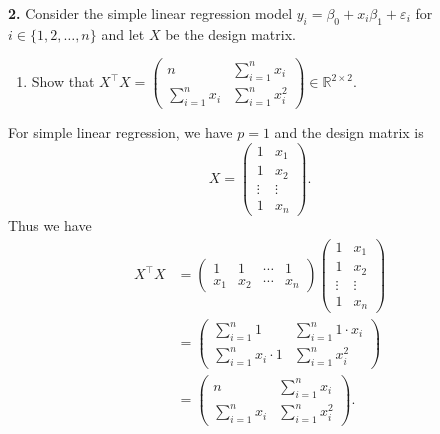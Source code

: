 \documentclass[
  a4paper,
]{article}
\providecommand{\tightlist}{%
  \setlength{\itemsep}{0pt}\setlength{\parskip}{0pt}}
\theoremstyle{definition}
\theoremstyle{definition}
\theoremstyle{definition}
\theoremstyle{definition}
\theoremstyle{remark}
\begin{document}
\textbf{2.} Consider the simple linear regression model
\(y_i = \beta_0 + x_{i} \beta_1 + \varepsilon_i\) for
\(i \in \{1, 2, \ldots, n\}\) and let \(X\) be the design matrix.

\begin{enumerate}
\def\labelenumi{\alph{enumi}.}
\tightlist
\item
  Show that \(\displaystyle X^\top X = \begin{pmatrix}
   n & \sum_{i=1}^n x_i \\
   \sum_{i=1}^n x_i & \sum_{i=1}^n x_i^2
      \end{pmatrix} \in \mathbb{R}^{2\times 2}\).
\end{enumerate}

\begin{myanswers}
For simple linear regression, we have \(p=1\) and the design matrix is
\begin{equation*}
    X = \begin{pmatrix}
      1 & x_1 \\
      1 & x_2 \\
      \vdots & \vdots \\
      1 & x_n
    \end{pmatrix}.
  \end{equation*}
Thus we have
\begin{align*}
    X^\top X
    &= \begin{pmatrix}
        1 & 1 & \cdots & 1 \\
        x_1 & x_2 & \cdots & x_n
    \end{pmatrix} \begin{pmatrix}
      1 & x_1 \\
      1 & x_2 \\
      \vdots & \vdots \\
      1 & x_n
    \end{pmatrix} \\
    &= \begin{pmatrix}
      \sum_{i=1}^n 1 &  \sum_{i=1}^n 1 \cdot x_i \\
      \sum_{i=1}^n x_i \cdot 1 & \sum_{i=1}^n x_i^2
    \end{pmatrix} \\
    &= \begin{pmatrix}
      n & \sum_{i=1}^n x_i \\
      \sum_{i=1}^n x_i & \sum_{i=1}^n x_i^2
    \end{pmatrix}.
  \end{align*}

\end{myanswers}
\end{document}
